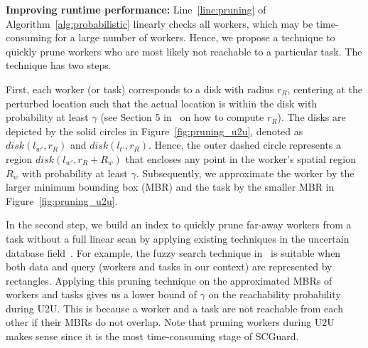 \documentclass{USC-Thesis}
\numberwithin{equation}{chapter}
\begin{document}
\textbf{Improving runtime performance:}
Line~\ref{line:pruning} of Algorithm~\ref{alg:probabilistic} linearly checks all workers, which may be time-consuming for a large number of workers. Hence, we propose a technique to quickly prune workers who are most likely not reachable to a particular task. The technique has two steps.

First, each worker (or task) corresponds to a disk with radius $r_R$, centering at the perturbed location such that the actual location is within the disk with probability at least $\gamma$ (see Section 5 in~\cite{andres2013geo} on how to compute $r_R$). The disks are depicted by the solid circles in Figure~\ref{fig:pruning_u2u}, denoted as $disk(l_{w'},r_R)$ and $disk(l_{t'},r_R)$. Hence, the outer dashed circle represents a region $disk(l_{w'},r_R+R_w)$ that encloses any point in the worker's spatial region $R_w$ with probability at least $\gamma$. Subsequently, we approximate the worker by the larger minimum bounding box (MBR) and the task by the smaller MBR in Figure~\ref{fig:pruning_u2u}.

In the second step, we build an index to quickly prune far-away workers from a task without a full linear scan by applying existing techniques in the uncertain database field~\cite{tao2007range,bernecker2011novel}. For example, the fuzzy search technique in~\cite{tao2007range} is suitable when both data and query (workers and tasks in our context) are represented by rectangles. Applying this pruning technique on the approximated MBRs of workers and tasks gives us a lower bound of $\gamma$ on the reachability probability during U2U. This is because a worker and a task are not reachable from each other if their MBRs do not overlap.
Note that pruning workers during U2U makes sense since it is the most time-consuming stage of SCGuard. %

\end{document}
